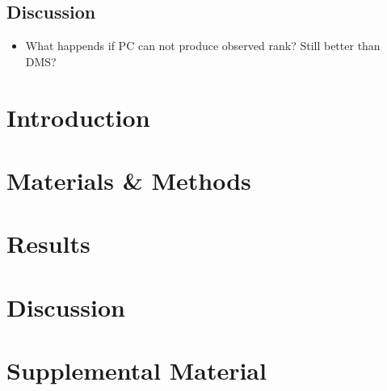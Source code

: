 \documentclass[12pt]{article}
\begin{document}
\subsection*{Discussion}
\begin{itemize}
	\item What happends if PC can not produce observed rank? Still better than DMS?
\end{itemize}

\section*{Introduction}
\section*{Materials \& Methods}	
\section*{Results}
\section*{Discussion}

\section*{Supplemental Material}
\end{document}
